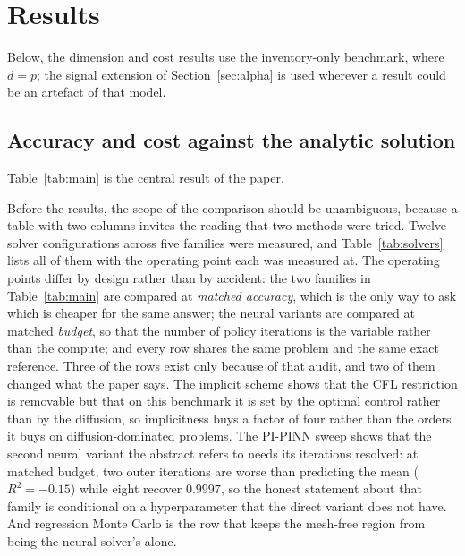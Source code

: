 \documentclass[conference]{IEEEtran}
\begin{document}
\section{Results}\label{sec:results}

Below, the dimension and cost results use the inventory-only benchmark, where $d = p$; the signal
extension of Section~\ref{sec:alpha} is used wherever a result could be an artefact of that model.

\subsection{Accuracy and cost against the analytic solution}
Table~\ref{tab:main} is the central result of the paper.


Before the results, the scope of the comparison should be unambiguous, because a table with two
columns invites the reading that two methods were tried. Twelve solver configurations across five
families were measured, and Table~\ref{tab:solvers} lists all of them with the operating point each
was measured at. The operating points differ by design rather than by accident: the two families in
Table~\ref{tab:main} are compared at \emph{matched accuracy}, which is the only way to ask which is
cheaper for the same answer; the neural variants are compared at matched \emph{budget}, so that the
number of policy iterations is the variable rather than the compute; and every row shares the same
problem and the same exact reference. Three of the rows exist only because of that audit, and two of
them changed what the paper says. The implicit scheme shows that the CFL restriction is removable but
that on this benchmark it is set by the optimal control rather than by the diffusion, so implicitness
buys a factor of four rather than the orders it buys on diffusion-dominated problems. The PI-PINN
sweep shows that the second neural variant the abstract refers to needs its iterations resolved: at
matched budget, two outer iterations are worse than predicting the mean ($R^2 = -0.15$) while eight
recover $0.9997$, so the honest statement about that family is conditional on a hyperparameter that
the direct variant does not have. And regression Monte Carlo is the row that keeps the mesh-free
region from being the neural solver's alone.


\end{document}
